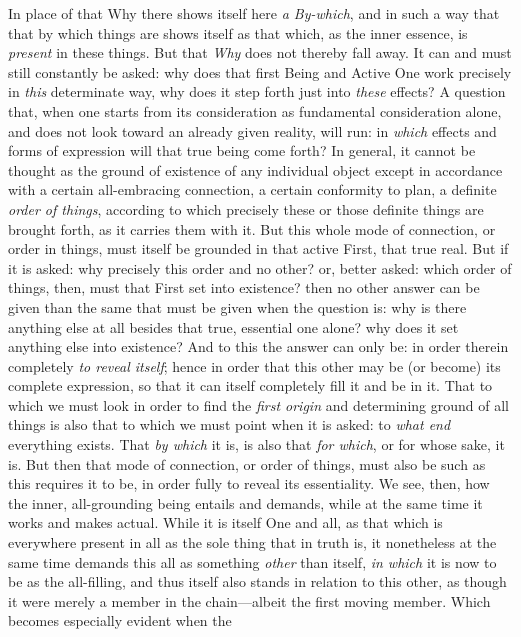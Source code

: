 \documentclass[12pt,a4paper]{book}
\begin{document}
In place of that Why there shows itself here \emph{a By-which}, and in such a way
that that by which things are shows itself as that which, as the inner essence, is
\emph{present} in these things. But that \emph{Why} does not thereby fall away. It
can and must still constantly be asked: why does that first Being and Active One
work precisely in \emph{this} determinate way, why does it step forth just into
\emph{these} effects? A question that, when one starts from its consideration as
fundamental consideration alone, and does not look toward an already given reality,
will run: in \emph{which} effects and forms of expression will that true being come
forth? In general, it cannot be thought as the ground of existence of any individual
object except in accordance with a certain all-embracing connection, a certain
conformity to plan, a definite \emph{order of things}, according to which precisely
these or those definite things are brought forth, as it carries them with it. But
this whole mode of connection, or order in things, must itself be grounded in that
active First, that true real. But if it is asked: why precisely this order and no
other? or, better asked: which order of things, then, must that First set into
existence? then no other answer can be given than the same that must be given when
the question is: why is there anything else at all besides that true, essential one
alone? why does it set anything else into existence? And to this the answer can only
be: in order therein completely \emph{to reveal itself}; hence in order that this
other may be (or become) its complete expression, so that it can itself completely
fill it and be in it. That to which we must look in order to find the \emph{first
origin} and determining ground of all things is also that to which we must point when
it is asked: to \emph{what end} everything exists. That \emph{by which} it is, is
also that \emph{for which}, or for whose sake, it is. But then that mode of
connection, or order of things, must also be such as this requires it to be, in order
fully to reveal its essentiality. We see, then, how the inner, all-grounding being
entails and demands, while at the same time it works and makes actual. While it is
itself One and all, as that which is everywhere present in all as the sole thing that
in truth is, it nonetheless at the same time demands this all as something
\emph{other} than itself, \emph{in which} it is now to be as the all-filling, and thus
itself also stands in relation to this other, as though it were merely a member in
the chain---albeit the first moving member. Which becomes especially evident when the
\end{document}
